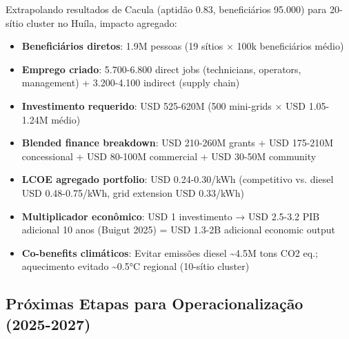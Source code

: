 \documentclass[12pt, a4paper]{article}
\begin{document}
Extrapolando resultados de Cacula (aptidão 0.83, beneficiários 95.000) para 20-sítio cluster no Huíla, impacto agregado:
\begin{itemize}
\item\textbf{Beneficiários diretos}: 1.9M pessoas (19 sítios × 100k beneficiários médio)
\item\textbf{Emprego criado}: 5.700-6.800 direct jobs (technicians, operators, management) + 3.200-4.100 indirect (supply chain)
\item\textbf{Investimento requerido}: USD 525-620M (500 mini-grids × USD 1.05-1.24M médio)
\item\textbf{Blended finance breakdown}: USD 210-260M grants + USD 175-210M concessional + USD 80-100M commercial + USD 30-50M community
\item\textbf{LCOE agregado portfolio}: USD 0.24-0.30/kWh (competitivo vs. diesel USD 0.48-0.75/kWh, grid extension USD 0.33/kWh)
\item\textbf{Multiplicador econômico}: USD 1 investimento → USD 2.5-3.2 PIB adicional 10 anos (Buigut 2025) = USD 1.3-2B adicional economic output
\item\textbf{Co-benefits climáticos}: Evitar emissões diesel \textasciitilde{}4.5M tons CO2 eq.; aquecimento evitado \textasciitilde{}0.5°C regional (10-sítio cluster)
\end{itemize}

\subsection{Próximas Etapas para Operacionalização (2025-2027)}
\end{document}
